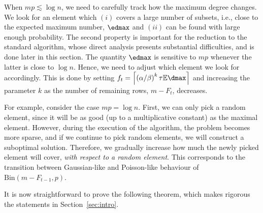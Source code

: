 \noindent
When \(mp \lesssim \log n\), we need to carefully track how the maximum degree changes. We look for an element which \((i)\) covers a large number of subsets, i.e., close to the expected maximum number, \(\edmax\) and \((ii)\) can be found with large enough probability. The second property is important for the reduction to the standard \greedy algorithm, whose direct analysis presents substantial difficulties, and is done later in this section. The quantity $\edmax$ is sensitive to $mp$ whenever the latter is close to $\log{n}$. Hence, we need to adjust which element we look for accordingly. This is done by setting \(f_t = \left\lceil\left(\alpha / \beta \right)^k \tau\mathbb{E}\dmax\right\rceil\) and increasing the parameter \(k\) as the number of remaining rows, \(m - F_t\), decreases. 

\noindent
For example, consider the case \(mp = \log n\). First, we can only pick a random element, since it will be as good (up to a multiplicative constant) as the maximal element. However, during the execution of the algorithm, the problem becomes more sparse, and if we continue to pick random elements, we will construct a suboptimal solution. Therefore, we gradually increase how much the newly picked element will cover, \emph{with respect to a random element}. This corresponds to the transition between Gaussian-like and Poisson-like behaviour of \(\mathrm{Bin}(m - F_{t - 1}, p)\).

\noindent
It is now straightforward to prove the following theorem, which makes rigorous the statements in Section~\ref{sec:intro}.

